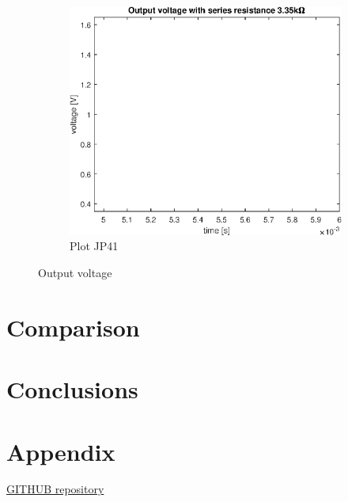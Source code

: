 \documentclass[notitlepage, a4paper, 11pt]{article}
\begin{document}
\begin{figure}[H]
\begin{subfigure}{0.45 \textwidth}
			\includegraphics[width=\textwidth]{../Matlab/img/CircuitC1out}
			\caption{Plot JP41}
		\end{subfigure}
		\caption{Output voltage}
	\end{figure}
	
	\section{Comparison}
	\section{Conclusions}
	
	\newpage
	\appendix
	\section{Appendix}\label{sec:appendix}
	\href{https://github.com/kamilix2003/CT_labs}{GITHUB repository}
	\inputminted{matlab}{../Matlab/main.m}
\end{document}
